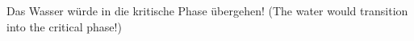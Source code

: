Das Wasser würde in die kritische Phase übergehen!  
(The water would transition into the critical phase!)